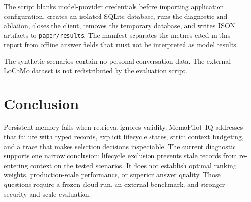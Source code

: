 \documentclass[11pt]{article}
\newcommand{\sysname}{MemoPilot~IQ}
\begin{document}
The script blanks model-provider credentials before importing application
configuration, creates an isolated SQLite database, runs the diagnostic and
ablation, closes the client, removes the temporary database, and writes JSON
artifacts to \texttt{paper/results}. The manifest separates the metrics cited
in this report from offline answer fields that must not be interpreted as model
results.

The synthetic scenarios contain no personal conversation data. The external
LoCoMo dataset is not redistributed by the evaluation script.

\section{Conclusion}

Persistent memory fails when retrieval ignores validity. \sysname{} addresses
that failure with typed records, explicit lifecycle states, strict context
budgeting, and a trace that makes selection decisions inspectable. The current
diagnostic supports one narrow conclusion: lifecycle exclusion prevents stale
records from re-entering context on the tested scenarios. It does not establish
optimal ranking weights, production-scale performance, or superior answer
quality. Those questions require a frozen cloud run, an external benchmark, and
stronger security and scale evaluation.



\end{document}

